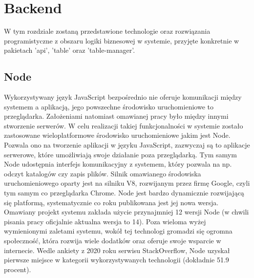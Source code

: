 \chapter{Backend}
\label{ch:backend}
W tym rozdziale zostaną przedstawione technologie oraz rozwiązania programistyczne z obszaru logiki biznesowej w systemie, przyjęte konkretnie w pakietach 'api', 'table' oraz 'table-manager'.

\label{section:node}
\section{Node}

Wykorzystywany język JavaScript bezpośrednio nie oferuje komunikacji między systemem a aplikacją, jego powszechne środowisko uruchomieniowe to przeglądarka. Założeniami natomiast omawianej pracy było między innymi stworzenie serwerów. W celu realizacji takiej funkcjonalności w systemie zostało zastosowane wieloplatformowe środowisko uruchomieniowe jakim jest Node. Pozwala ono na tworzenie aplikacji w języku JavaScript, zazwyczaj są to aplikacje serwerowe, które umożliwiają swoje działanie poza przeglądarką. Tym samym Node udostępnia interfejs komunikacyjny z systemem, który pozwala na np. odczyt katalogów czy  zapis plików. Silnik omawianego środowiska uruchomieniowego oparty jest na silniku V8, rozwijanym przez firmę Google, czyli tym samym co przeglądarka Chrome. Node jest bardzo dynamicznie rozwijającą się platformą, systematycznie co roku publikowana jest jej nowa wersja. Omawiany projekt systemu zakłada użycie przynajmniej 12 wersji Node (w chwili pisania pracy oficjalnie aktualna wersja to 14). Poza wieloma wyżej wymienionymi zaletami systemu, wokół tej technologi gromadzi się ogromna społeczność, która rozwija wiele dodatków oraz oferuje swoje wsparcie w internecie. Wedle ankiety z 2020 roku serwisu StackOverflow, Node uzyskał pierwsze miejsce w kategorii wykorzystywanych technologii (dokładnie 51.9 procent). \cite{StackOverflowSurvey, ExpressDocs}

